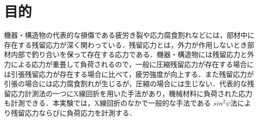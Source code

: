 \section{目的}
機器・構造物の代表的な損傷である疲労き裂や応力腐食割れなどには，部材中に存在する残留応力が深く関わっている．残留応力とは，外力が作用しないとき部材内部で釣り合いを保って存在する応力である．機器・構造物には残留応力と外力による応力が重畳して負荷されるので，一般に圧縮残留応力が存在する場合には引張残留応力が存在する場合に比べて，疲労強度が向上する．また残留応力が引張の場合には応力腐食割れが生じるが，圧縮の場合には生じない．代表的な残留応力計測法の一つにX線回折を用いた手法があり，機械材料に負荷された応力も計測できる．本実験では，X線回折のなかで一般的な手法である $sin^2\psi$法により残留応力ならびに負荷応力を計測する．
